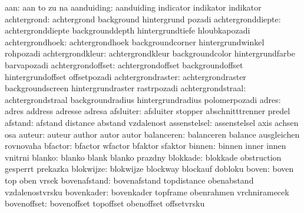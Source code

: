                  aan:  aan                  to                   zu
                       na
          aanduiding:  aanduiding           indicator            indikator
                       indikator
         achtergrond:  achtergrond          background           hintergrund
                       pozadi
   achtergronddiepte:  achtergronddiepte    backgrounddepth      hintergrundtiefe
                       hloubkapozadi
     achtergrondhoek:  achtergrondhoek      backgroundcorner     hintergrundwinkel
                       rohpozadi
    achtergrondkleur:  achtergrondkleur     backgroundcolor      hintergrundfarbe
                       barvapozadi
   achtergrondoffset:  achtergrondoffset    backgroundoffset     hintergrundoffset
                       offsetpozadi
   achtergrondraster:  achtergrondraster    backgroundscreen     hintergrundraster
                       rastrpozadi
   achtergrondstraal:  achtergrondstraal    backgroundradius     hintergrundradius
                       polomerpozadi
               adres:  adres                address              adresse
                       adresa
           afsluiter:  afsluiter            stopper              abschnitttrenner
                       predel
             afstand:  afstand              distance             abstand
                       vzdalenost
        assenstelsel:  assenstelsel         axis                 achsen
                       osa
              auteur:  auteur               author               autor
                       autor
          balanceren:  balanceren           balance              ausgleichen
                       rovnovaha
             bfactor:  bfactor              wfactor              bfaktor
                       sfaktor
              binnen:  binnen               inner                innen
                       vnitrni
              blanko:  blanko               blank                blanko
                       prazdny
            blokkade:  blokkade             obstruction          gesperrt
                       prekazka
           blokwijze:  blokwijze            blockway             blockauf
                       dobloku
               boven:  boven                top                  oben
                       vrsek
        bovenafstand:  bovenafstand         topdistance          obenabstand
                       vzdalenostvrsku
          bovenkader:  bovenkader           topframe             obenrahmen
                       vrchniramecek
         bovenoffset:  bovenoffset          topoffset            obenoffset
                       offsetvrsku
